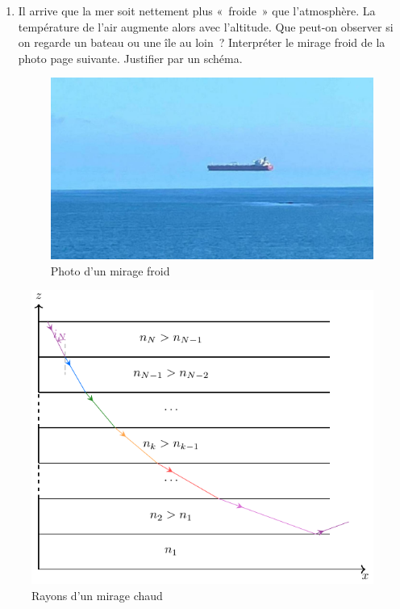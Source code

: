 \documentclass[../../main/main.tex]{subfiles}
\begin{document}
{\begin{enumerate}
		\item Il arrive que la mer soit nettement plus «~froide~» que l'atmosphère.
		      La température de l'air augmente alors avec l'altitude. Que peut-on
		      observer si on regarde un bateau ou une île au loin~? Interpréter le
		      mirage froid de la photo page suivante. Justifier par un schéma.
		      \begin{figure}[h]
			      \centering
			      \includegraphics[width=.5\linewidth]{mirage_froid}
			      \captionsetup{justification=centering}
			      \caption{Photo d'un mirage froid}
			      \label{fig:mir_froid}
		      \end{figure}
	\end{enumerate}
}{
	\begin{figure}
		\vspace*{20pt}
		\centering
		\includegraphics[width=\linewidth]{mirage}
		\captionsetup{justification=centering}
		\caption{Rayons d'un mirage chaud}
		\label{fig:mirage}
	\end{figure}
	~
	\begin{enumerate}

\end{enumerate}}
\end{document}
